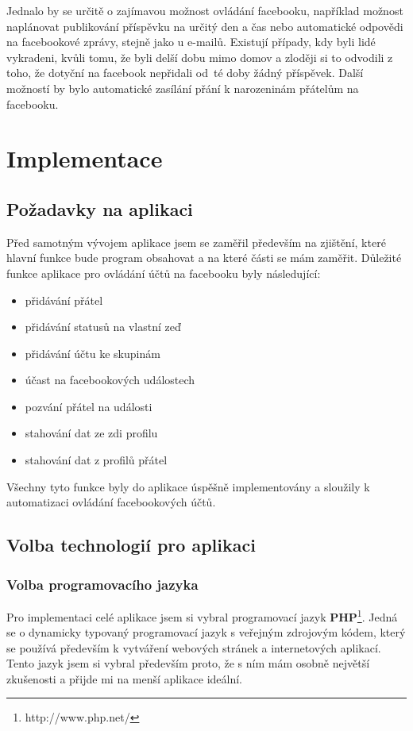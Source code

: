 \documentclass[thesis=M,czech]{FITthesis}[2013/05/10]
\begin{document}
Jednalo by se určitě o zajímavou možnost ovládání facebooku, například možnost naplánovat publikování příspěvku na určitý den a čas nebo automatické odpovědi na facebookové zprávy, stejně jako u e-mailů. Existují případy, kdy byli lidé vykradeni, kvůli tomu, že byli delší dobu mimo domov a zloději si to odvodili z toho, že dotyční na facebook nepřidali od~té doby žádný příspěvek. Další možností by bylo automatické zasílání přání k narozeninám přátelům na facebooku.



\chapter{Implementace}

\section{Požadavky na aplikaci}

Před samotným vývojem aplikace jsem se zaměřil především na zjištění, které hlavní funkce bude program obsahovat a na které části se mám zaměřit. Důležité funkce aplikace pro ovládání účtů na facebooku byly následující:

\begin{itemize}
  \item přidávání přátel
  \item přidávání statusů na vlastní zeď
  \item přidávání účtu ke skupinám
  \item účast na facebookových událostech
  \item pozvání přátel na události
  \item stahování dat ze zdi profilu
  \item stahování dat z profilů přátel
\end{itemize}

Všechny tyto funkce byly do aplikace úspěšně implementovány a sloužily k automatizaci ovládání facebookových účtů.


\section{Volba technologií pro aplikaci}

\subsection{Volba programovacího jazyka}

Pro implementaci celé aplikace jsem si vybral programovací jazyk \textbf{PHP}\footnote{http://www.php.net/}. Jedná se o dynamicky typovaný programovací jazyk s veřejným zdrojovým kódem, který se používá především k vytváření webových stránek a internetových aplikací. Tento jazyk jsem si vybral především proto, že s ním mám osobně největší zkušenosti a přijde mi na menší aplikace ideální. 
\end{document}
